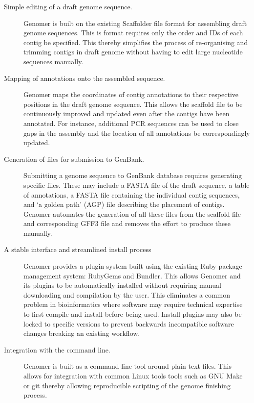\documentclass[10pt]{article}
\begin{document}
\begin{description} 

  \item[Simple editing of a draft genome sequence.]{Genomer is built on the
  existing Scaffolder \cite{barton2012} file format for assembling draft genome
  sequences. This is format requires only the order and IDs of each contig be
  specified. This thereby simplifies the process of re-organising and trimming
  contigs in draft genome without having to edit large nucleotide sequences
  manually.}

  \item[Mapping of annotations onto the assembled sequence.]{Genomer maps the
  coordinates of contig annotations to their respective positions in the draft
  genome sequence. This allows the scaffold file to be continuously improved
  and updated even after the contigs have been annotated. For instance,
  additional PCR sequences can be used to close gaps in the assembly and the
  location of all annotations be correspondingly updated.}

  \item[Generation of files for submission to GenBank.]{Submitting a genome
  sequence to GenBank database requires generating specific files. These may
  include a FASTA file of the draft sequence, a table of annotations, a FASTA
  file containing the individual contig sequences, and `a golden path' (AGP)
  \cite{agp-spec} file describing the placement of contigs. Genomer automates
  the generation of all these files from the scaffold file and corresponding
  GFF3 file and removes the effort to produce these manually.}

  \item[A stable interface and streamlined install process]{Genomer provides a
  plugin system built using the existing Ruby package management system:
  RubyGems and Bundler. This allows Genomer and its plugins to be automatically
  installed without requiring manual downloading and compilation by the user.
  This eliminates a common problem in bioinformatics where software may require
  technical expertise to first compile and install before being used. Install
  plugins may also be locked to specific versions to prevent backwards
  incompatible software changes breaking an existing workflow.}

  \item[Integration with the command line.]{Genomer is built as a command line
  tool around plain text files. This allows for integration with common Linux
  tools tools such as GNU Make or git thereby allowing reproducible scripting
  of the genome finishing process.}

\end{description}
\end{document}
